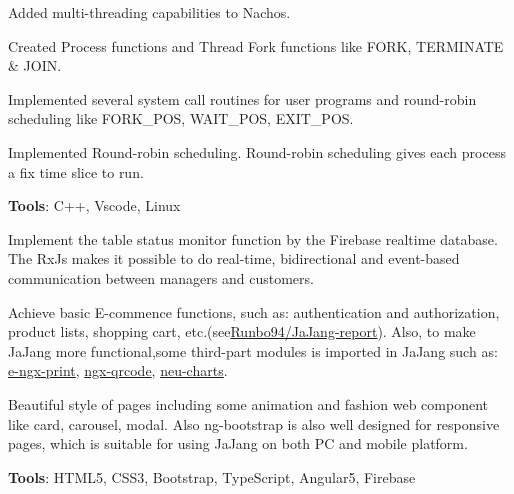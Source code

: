 \documentclass[letterpaper]{deedy-resume} %
\begin{document}
\begin{minipage}[t]{0.33\textwidth} %


\end{minipage} %
\begin{minipage}[t]{1\textwidth} %
\begin{tightitemize}
	\item Added multi-threading capabilities to Nachos.
	\item Created Process functions and Thread Fork functions like FORK, TERMINATE \& JOIN.
	\item Implemented several system call routines for user programs and round-robin scheduling like FORK\_POS, WAIT\_POS, EXIT\_POS.
	\item Implemented Round-robin scheduling. Round-robin scheduling gives each process a fix time slice to run.
	\item \textbf{Tools}: C++, Vscode, Linux
\end{tightitemize}

\sectionspace %
\vspace{\topsep} %
\begin{tightitemize}
	\item Implement the table status monitor function by the Firebase realtime database. The RxJs makes it possible to do real-time, bidirectional and event-based communication between managers and customers.
	\item Achieve basic E-commence functions, such as: authentication and authorization, product lists, shopping cart, etc.(see\href{https://github.com/Runbo94/JaJang-report}{Runbo94/JaJang-report}). Also, to make JaJang more functional,some third-part modules is imported in JaJang such as: \href{https://github.com/laixiangran/e-ngx-print}{e-ngx-print}, \href{https://github.com/nacardin/ngx-qrcode}{ngx-qrcode},
	\href{https://www.npmjs.com/package/neu-charts}{neu-charts}.
	\item  Beautiful style of pages including some animation and fashion web component like card, carousel, modal. Also ng-bootstrap is also well designed for responsive pages, which is suitable for using JaJang on both PC and mobile platform.
	\item \textbf{Tools}: HTML5, CSS3, Bootstrap, TypeScript, Angular5, Firebase
\end{tightitemize}
\sectionspace %


\end{minipage}
\end{document}
